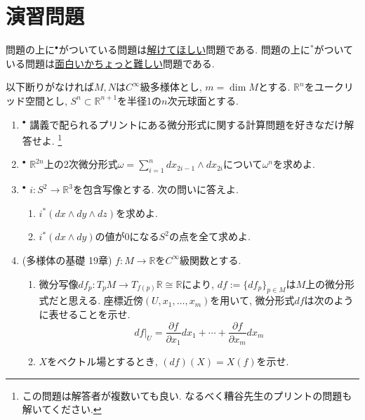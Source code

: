 \documentclass[dvipdfmx,a4paper,11pt]{article}
\newcommand{\R}{\mathbb{R}}
\theoremstyle{definition}
\newcommand{\pdrv}[2]{\frac{\partial #1}{\partial #2}}
\begin{document}
\section{演習問題}
問題の上に$^{\bullet}$がついている問題は\underline{解けてほしい}問題である. 問題の上に$^{*}$がついている問題は\underline{面白いかちょっと難しい}問題である. 

以下断りがなければ$M,N$は$C^{\infty}$級多様体とし, $m = \dim M$とする.
$\R^n$をユークリッド空間とし, $S^n \subset \R^{n+1}$を半径1の$n$次元球面とする.

\vspace{11pt}
\hspace{-22pt}{\large $\bullet$ 微分形式の問題}
\begin{enumerate}[label=\textbf{問}3.\arabic*]

\item $^{\bullet}$ 講義で配られるプリントにある微分形式に関する計算問題を好きなだけ解答せよ. \footnote{この問題は解答者が複数いても良い. なるべく糟谷先生のプリントの問題も解いてください. }

\item $^{\bullet}$ $\R^{2n}$上の2次微分形式$\omega = \sum_{i=1}^{n} dx_{2i-1} \wedge dx_{2i}$について$\omega^n$を求めよ.

\item $^{\bullet}$ $i : S^2 \rightarrow \R^3$を包含写像とする. 次の問いに答えよ.
\begin{enumerate}
 \setlength{\parskip}{0cm}
  \setlength{\itemsep}{2pt} 
\item $i^{*}(dx \wedge dy \wedge dz)$を求めよ.
\item $i^{*}(dx \wedge dy)$の値が0になる$S^2$の点を全て求めよ.
\end{enumerate}


\item (多様体の基礎 19章) $f : M \rightarrow \R$を$C^{\infty}$級関数とする. 
\begin{enumerate}
 \setlength{\parskip}{0cm}
  \setlength{\itemsep}{2pt} 
\item 微分写像$df_{p} : T_{p}M \rightarrow T_{f(p)}\R \cong \R$により, $df:= \{df_{p}\}_{p \in M}$は$M$上の微分形式だと思える.
 座標近傍$(U, x_1, \ldots, x_m)$を用いて, 微分形式$df$は次のように表せることを示せ. 
 $$
 df|_{U} = \pdrv{f}{x_1} dx_1 + \cdots + \pdrv{f}{x_m}dx_{m}
 $$
\item $X$をベクトル場とするとき, $(df) (X) = X(f)$を示せ.  %
\end{enumerate}





\end{enumerate}
\end{document}
